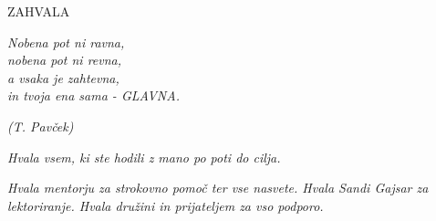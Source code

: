 
  \begin{center}
    \Large
    ZAHVALA
  \end{center}

  \vspace{1cm}

  \begin{minipage}[t]{0.35\textwidth}
  \textit{
    Nobena pot ni ravna,\\
    nobena pot ni revna,\\
    a vsaka je zahtevna,\\
    in tvoja ena sama - GLAVNA.
  }  
    \begin{flushright}
      \textit{(T. Pavček)}
    \end{flushright}  
  
  \end{minipage}

  \vspace{1cm}

  \begin{sloppypar}
    \textit{Hvala vsem, ki ste hodili z mano po poti do cilja.}
  \end{sloppypar}

  \vspace{1cm}

  \begin{sloppypar}
    \textit{Hvala mentorju \mentor za strokovno pomoč ter vse nasvete. Hvala
      Sandi Gajsar za lektoriranje. Hvala družini in prijateljem za vso
      podporo.} 
  \end{sloppypar}

  \vfill

